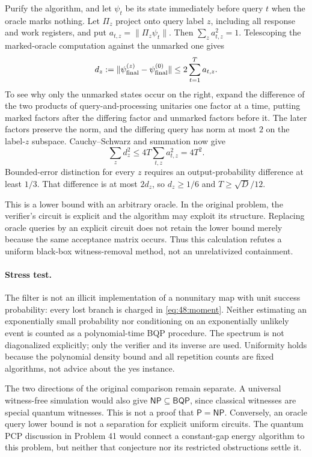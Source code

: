\documentclass[11pt,a4paper]{article}
\numberwithin{equation}{section}
\begin{document}
Purify the algorithm, and let $\psi_t$ be its state immediately before
query $t$ when the oracle marks nothing. Let $\Pi_z$ project onto query
label $z$, including all response and work registers, and put
$a_{t,z}=\|\Pi_z\psi_t\|$. Then $\sum_z a_{t,z}^2=1$.
Telescoping the marked-oracle computation against the unmarked one gives
\[
 d_z:=\|\psi^{(z)}_{\rm final}-\psi^{(0)}_{\rm final}\|
       \le 2\sum_{t=1}^T a_{t,z}.
\]
To see why only the unmarked states occur on the right, expand the
difference of the two products of query-and-processing unitaries one factor
at a time, putting marked factors after the differing factor and unmarked
factors before it. The later factors preserve the norm, and the differing
query has norm at most $2$ on the label-$z$ subspace.
Cauchy--Schwarz and summation now give
\[
 \sum_z d_z^2\le4T\sum_{t,z}a_{t,z}^2=4T^2.
\]
Bounded-error distinction for every $z$ requires an output-probability
difference at least $1/3$. That difference is at most $2d_z$, so
$d_z\ge1/6$ and $T\ge\sqrt D/12$.

This is a lower bound with an arbitrary oracle. In the original problem,
the verifier's circuit is explicit and the algorithm may exploit its
structure. Replacing oracle queries by an explicit circuit does not retain
the lower bound merely because the same acceptance matrix occurs. Thus this
calculation refutes a uniform black-box witness-removal method, not an
unrelativized containment.

\paragraph{Stress test.}
The filter is not an illicit implementation of a nonunitary map with unit
success probability: every lost branch is charged in
\eqref{eq:48:moment}. Neither estimating an exponentially small probability
nor conditioning on an exponentially unlikely event is counted as a
polynomial-time BQP procedure. The spectrum is not diagonalized explicitly;
only the verifier and its inverse are used. Uniformity holds because the
polynomial density bound and all repetition counts are fixed algorithms,
not advice about the yes instance.

The two directions of the original comparison remain separate. A universal
witness-free simulation would also give $\mathsf{NP}\subseteq\mathsf{BQP}$,
since classical witnesses are special quantum witnesses. This is not a proof
that $\mathsf P=\mathsf{NP}$. Conversely, an oracle query lower bound is
not a separation for explicit uniform circuits. The quantum PCP discussion
in Problem 41 would connect a constant-gap energy algorithm to this problem,
but neither that conjecture nor its restricted obstructions settle it.
\end{document}
